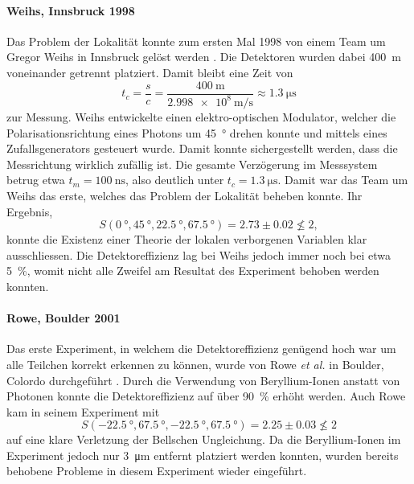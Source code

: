 \begin{refsection}
\paragraph{Weihs, Innsbruck 1998}
Das Problem der Lokalit\"at konnte zum ersten Mal 1998 von einem Team
um Gregor Weihs in Innsbruck gel\"ost werden \cite{Bell:Weihs1998}.
Die Detektoren wurden dabei \SI{400}{\meter} voneinander getrennt platziert.
Damit bleibt eine Zeit von
\[
    t_c = \frac{s}{c} = \frac{\SI{400}{\meter}}{\SI{2.998e8}{\meter\per\second}} \approx \SI{1.3}{\micro\second}
\]
zur Messung.
Weihs entwickelte einen elektro-optischen Modulator, welcher die 
Polarisationsrichtung eines Photons um \SI{45}{\degree} drehen konnte und
mittels eines Zufallsgenerators gesteuert wurde.
Damit konnte sichergestellt werden, dass die Messrichtung wirklich zuf\"allig
ist.
Die gesamte Verz\"ogerung im Messsystem betrug etwa 
$t_m = \SI{100}{\nano\second}$, also deutlich unter $t_c = \SI{1.3}{\micro\second}$. 
Damit war das Team um Weihs das erste, welches das Problem der Lokalit\"at
beheben konnte.
Ihr Ergebnis,
\[
    S(\SI{0}{\degree},\SI{45}{\degree},\SI{22.5}{\degree},\SI{67.5}{\degree})
    = 2.73 \pm 0.02 \nleqslant 2,
\]
konnte die Existenz einer Theorie der lokalen verborgenen Variablen klar 
ausschliessen.
Die Detektoreffizienz lag bei Weihs jedoch immer noch bei etwa \SI{5}{\percent},
womit nicht alle Zweifel am Resultat des Experiment behoben werden konnten.

\paragraph{Rowe, Boulder 2001}
Das erste Experiment, in welchem die Detektoreffizienz gen\"ugend hoch war um
alle Teilchen korrekt erkennen zu k\"onnen, wurde von Rowe \textit{et al.}
in Boulder, Colordo durchgef\"uhrt \cite{Bell:Rowe2001}. 
Durch die Verwendung von Beryllium-Ionen anstatt von Photonen konnte die
Detektoreffizienz auf \"uber \SI{90}{\percent} erh\"oht werden.
Auch Rowe kam in seinem Experiment mit
\[
    S(\SI{-22.5}{\degree},\SI{67.5}{\degree},\SI{-22.5}{\degree},\SI{67.5}{\degree})
    = 2.25 \pm 0.03 \nleqslant 2
\]
auf eine klare Verletzung der Bellschen Ungleichung.
Da die Beryllium-Ionen im Experiment jedoch nur \SI{3}{\micro\meter}
entfernt platziert werden konnten, wurden bereits behobene Probleme in
diesem Experiment wieder eingef\"uhrt.


\end{refsection}
